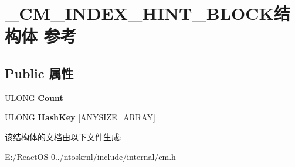 \hypertarget{struct___c_m___i_n_d_e_x___h_i_n_t___b_l_o_c_k}{}\section{\+\_\+\+C\+M\+\_\+\+I\+N\+D\+E\+X\+\_\+\+H\+I\+N\+T\+\_\+\+B\+L\+O\+C\+K结构体 参考}
\label{struct___c_m___i_n_d_e_x___h_i_n_t___b_l_o_c_k}
\subsection*{Public 属性}
\begin{DoxyCompactItemize}
\item 
\mbox{\label{struct___c_m___i_n_d_e_x___h_i_n_t___b_l_o_c_k_ae157cc074a3bd160e678cd870b9f30a3}} 
U\+L\+O\+NG {\bfseries Count}
\item 
\mbox{\label{struct___c_m___i_n_d_e_x___h_i_n_t___b_l_o_c_k_a502c86bad03e04534e4a3f43208bf370}} 
U\+L\+O\+NG {\bfseries Hash\+Key} \mbox{[}A\+N\+Y\+S\+I\+Z\+E\+\_\+\+A\+R\+R\+AY\mbox{]}
\end{DoxyCompactItemize}


该结构体的文档由以下文件生成\+:\begin{DoxyCompactItemize}
\item 
E\+:/\+React\+O\+S-\/0../ntoskrnl/include/internal/cm.\+h\end{DoxyCompactItemize}
